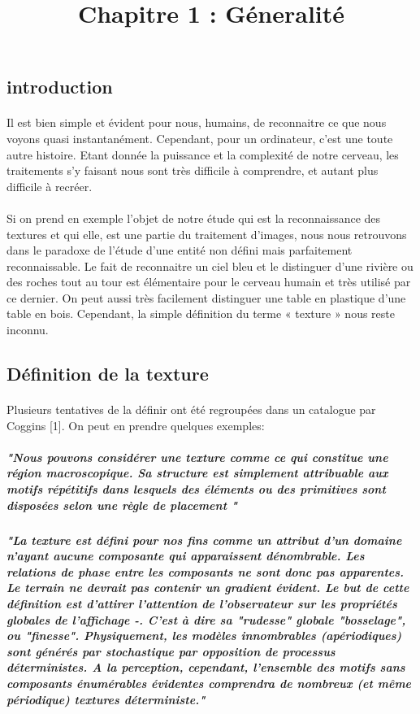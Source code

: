 \documentclass[12pt]{article}
\begin{document}
\title{Chapitre 1 : G\'eneralit\'e}
\date{}
\maketitle

\setcounter{section}{+1}
\subsection{introduction}
\paragraph{} 
Il est bien simple et évident pour nous, humains, de reconnaitre ce que nous voyons quasi instantanément.  Cependant, pour un ordinateur, c’est une toute autre histoire. Etant donnée la puissance et la complexité de notre cerveau,  les traitements s’y faisant nous sont très difficile à comprendre, et autant plus difficile à recréer. 
\paragraph{}
Si on prend en exemple l’objet de notre étude qui est la reconnaissance des textures et qui elle, est une partie du traitement d’images, nous nous retrouvons dans le paradoxe de l’étude d’une entité non défini mais parfaitement reconnaissable. Le fait de reconnaitre un ciel bleu et le distinguer d’une rivière ou des roches tout au tour est élémentaire  pour le cerveau humain et très utilisé par ce dernier. On peut aussi très facilement distinguer une table en plastique d’une table en bois. Cependant, la simple définition du  terme « texture » nous reste inconnu. 

\subsection{Définition de la texture}
\paragraph{}
Plusieurs tentatives de la définir ont été regroupées dans un catalogue par Coggins [1]. On peut en prendre quelques exemples:

\subparagraph{
"Nous pouvons considérer une texture comme ce qui constitue une région macroscopique. Sa structure est simplement attribuable aux motifs répétitifs dans lesquels des éléments ou des primitives sont disposées selon une règle de placement "
}

\subparagraph{
 "La texture est défini pour nos fins comme un attribut d'un domaine n'ayant aucune composante qui apparaissent dénombrable. Les relations de phase entre les composants ne sont donc pas apparentes. Le terrain ne devrait pas contenir un gradient évident. Le but de cette définition est d'attirer l'attention de l'observateur sur les propriétés globales de l'affichage -. C'est à dire sa "rudesse" globale "bosselage", ou "finesse". Physiquement, les modèles innombrables (apériodiques) sont générés par stochastique par opposition de processus déterministes. A la perception, cependant, l'ensemble des motifs sans composants énumérables évidentes comprendra de nombreux (et même périodique) textures déterministe."
}
\end{document}
